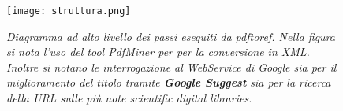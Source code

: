 \begin{figure}[b]
\begin{center}
\texttt{[image: struttura.png]}
\end{center}
\caption[Diagramma ad alto livello dei passi eseguiti dall'applicativo]{\textit{Diagramma ad alto livello dei passi eseguiti da pdftoref. Nella figura si nota l'uso del tool PdfMiner per per la conversione in XML. Inoltre si notano le interrogazione al WebService di Google sia per il miglioramento del titolo tramite \textbf{Google Suggest} sia per la ricerca della URL sulle più note scientific digital libraries.}}
\label{fig:layout}
\end{figure}

